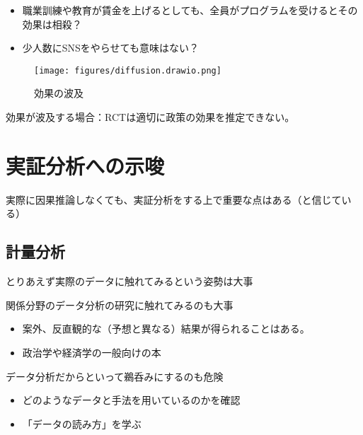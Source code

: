 \documentclass[
  xelatex,
  ja=standard]{bxjsarticle}
\providecommand{\tightlist}{%
  \setlength{\itemsep}{0pt}\setlength{\parskip}{0pt}}\usepackage{longtable,booktabs,array}
\begin{document}
\begin{itemize}
\tightlist
\item
  職業訓練や教育が賃金を上げるとしても、全員がプログラムを受けるとその効果は相殺？
\item
  少人数にSNSをやらせても意味はない？
\end{itemize}

\begin{figure}[htpb]

{\centering \texttt{[image: figures/diffusion.drawio.png]}

}

\caption{効果の波及}

\end{figure}

効果が波及する場合：RCTは適切に政策の効果を推定できない。

\hypertarget{ux5b9fux8a3cux5206ux6790ux3078ux306eux793aux5506}{%
\section{実証分析への示唆}\label{ux5b9fux8a3cux5206ux6790ux3078ux306eux793aux5506}}

実際に因果推論しなくても、実証分析をする上で重要な点はある（と信じている）

\hypertarget{ux8a08ux91cfux5206ux6790}{%
\subsection{計量分析}\label{ux8a08ux91cfux5206ux6790}}

とりあえず実際のデータに触れてみるという姿勢は大事

関係分野のデータ分析の研究に触れてみるのも大事

\begin{itemize}
\tightlist
\item
  案外、反直観的な（予想と異なる）結果が得られることはある。
\item
  政治学や経済学の一般向けの本\citep{banerjee2020, kitamura2020}
\end{itemize}

データ分析だからといって鵜呑みにするのも危険

\begin{itemize}
\tightlist
\item
  どのようなデータと手法を用いているのかを確認
\item
  「データの読み方」を学ぶ\citep{sugawara2022, ogiwara2023, tsutsui2023}
\end{itemize}
\end{document}
